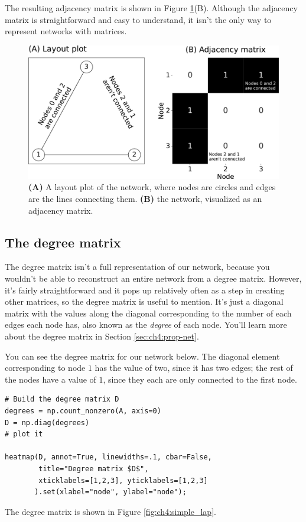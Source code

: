 The resulting adjacency matrix is shown in Figure \ref{fig:ch4:basic_mtxs}(B). Although the adjacency matrix is straightforward and easy to understand, it isn't the only way to represent networks with matrices.

\begin{figure}[h]
    \centering
    \includegraphics[width=0.8\linewidth]{representations/ch4/Images/basic_mtxs.png}
    \caption[Plotting a simple network as a layout plot and adjacency matrix heatmap]{\textbf{(A)} A layout plot of the network, where nodes are circles and edges are the lines connecting them. \textbf{(B)} the network, visualized as an adjacency matrix.}
    \label{fig:ch4:basic_mtxs}
\end{figure}

\subsection{The degree matrix}

The degree matrix isn't a full representation of our network, because you wouldn't be able to reconstruct an entire network from a degree matrix. However, it's fairly straightforward and it pops up relatively often as a step in creating other matrices, so the degree matrix is useful to mention. It's just a diagonal matrix with the values along the diagonal corresponding to the number of each edges each node has, also known as the \textit{degree} of each node. You'll learn more about the degree matrix in Section \ref{sec:ch4:prop-net}.

You can see the degree matrix for our network below. The diagonal element corresponding to node $1$ has the value of two, since it has two edges; the rest of the nodes have a value of $1$, since they each are only connected to the first node.

\begin{lstlisting}[style=python]
# Build the degree matrix D
degrees = np.count_nonzero(A, axis=0)
D = np.diag(degrees)
# plot it

heatmap(D, annot=True, linewidths=.1, cbar=False, 
        title="Degree matrix $D$", 
        xticklabels=[1,2,3], yticklabels=[1,2,3]
       ).set(xlabel="node", ylabel="node");

\end{lstlisting}
The degree matrix is shown in Figure \ref{fig:ch4:simple_lap}.

